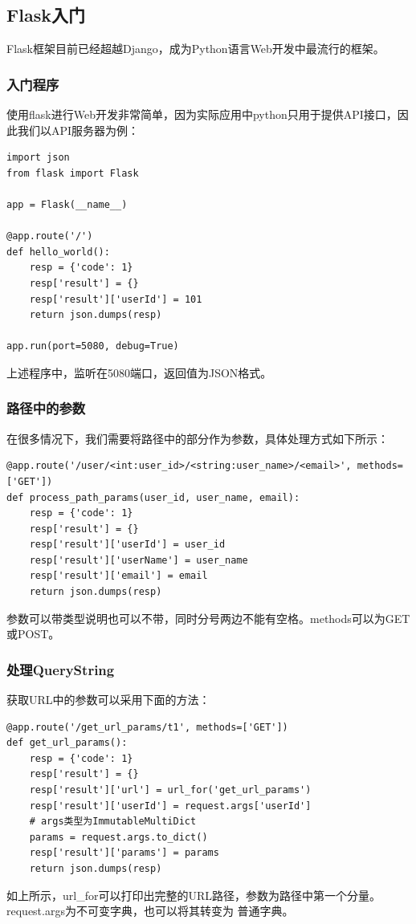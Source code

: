 \documentclass{article}
\begin{document}
\subsection{Flask入门}
Flask框架目前已经超越Django，成为Python语言Web开发中最流行的框架。
\subsubsection{入门程序}
使用flask进行Web开发非常简单，因为实际应用中python只用于提供API接口，因此我们以API服务器为例：
\begin{lstlisting}
import json
from flask import Flask

app = Flask(__name__)

@app.route('/')
def hello_world():
    resp = {'code': 1}
    resp['result'] = {}
    resp['result']['userId'] = 101
    return json.dumps(resp)

app.run(port=5080, debug=True)
\end{lstlisting}
上述程序中，监听在5080端口，返回值为JSON格式。
\subsubsection{路径中的参数}
在很多情况下，我们需要将路径中的部分作为参数，具体处理方式如下所示：
\begin{lstlisting}
@app.route('/user/<int:user_id>/<string:user_name>/<email>', methods=['GET'])
def process_path_params(user_id, user_name, email):
    resp = {'code': 1}
    resp['result'] = {}
    resp['result']['userId'] = user_id
    resp['result']['userName'] = user_name
    resp['result']['email'] = email
    return json.dumps(resp)
\end{lstlisting}
参数可以带类型说明也可以不带，同时分号两边不能有空格。methods可以为GET或POST。
\subsubsection{处理QueryString}
获取URL中的参数可以采用下面的方法：
\begin{lstlisting}
@app.route('/get_url_params/t1', methods=['GET'])
def get_url_params():
    resp = {'code': 1}
    resp['result'] = {}
    resp['result']['url'] = url_for('get_url_params')
    resp['result']['userId'] = request.args['userId']
    # args类型为ImmutableMultiDict
    params = request.args.to_dict()
    resp['result']['params'] = params
    return json.dumps(resp)
\end{lstlisting}
如上所示，url\_for可以打印出完整的URL路径，参数为路径中第一个分量。request.args为不可变字典，也可以将其转变为
普通字典。
\end{document}
